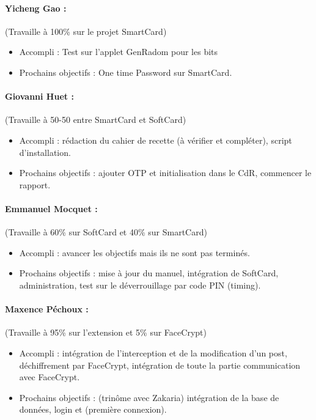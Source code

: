 \documentclass[a4paper,10pt]{article}
\begin{document}
\paragraph{Yicheng Gao :} (Travaille à 100\% sur le projet SmartCard)
\begin{itemize}
\item Accompli : Test sur l'applet GenRadom pour les bits
\item Prochains objectifs :  One time Password sur SmartCard.
\end{itemize}

\paragraph{Giovanni Huet : } (Travaille à 50-50 entre SmartCard et SoftCard) 
\begin{itemize}
    \item Accompli : rédaction du cahier de recette (à vérifier et 
        compléter), script d'installation.
    \item Prochains objectifs : ajouter OTP et initialisation dans le CdR,
    commencer le rapport.
\end{itemize}

\paragraph{Emmanuel Mocquet : } (Travaille à 60\% sur SoftCard et 40\% sur SmartCard)
\begin{itemize}
    \item Accompli : avancer les objectifs mais ils ne sont pas terminés.
\item Prochains objectifs : mise à jour du manuel, intégration de SoftCard,
        administration, test sur le déverrouillage par code PIN (timing).
\end{itemize}

\paragraph{Maxence Péchoux : } (Travaille à 95\% sur l'extension et 5\% sur FaceCrypt)
\begin{itemize}
\item Accompli : intégration de l'interception et de la modification d'un post,
    déchiffrement par FaceCrypt, intégration de toute la partie communication
    avec FaceCrypt.
    \item Prochains objectifs : (trinôme avec Zakaria) intégration de la 
    base de données, login et (première connexion).
\end{itemize}
\end{document}
